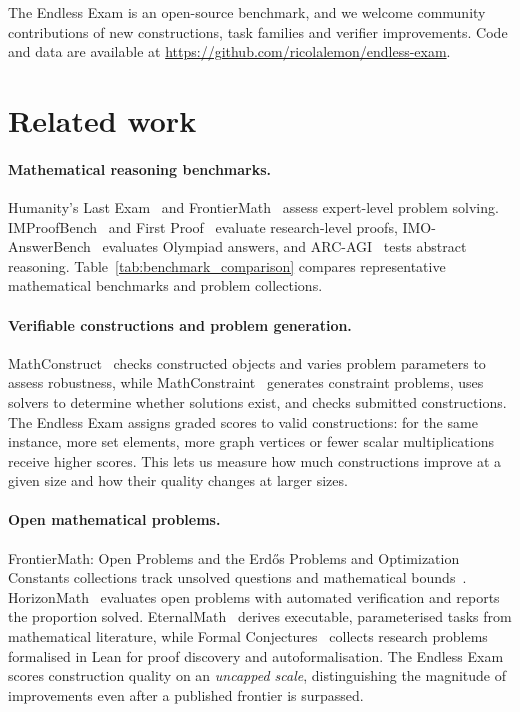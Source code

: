 \documentclass{article}
\begin{document}
The Endless Exam is an open-source benchmark, and we welcome community contributions of new constructions, task families and verifier improvements.
\ifdefined\EndlessExamPreprint
Code and data are available at \mbox{\url{https://github.com/ricolalemon/endless-exam}}.
\fi

\section{Related work}
\label{sec:related}

\paragraph{Mathematical reasoning benchmarks.}
Humanity's Last Exam~\citep{phan2025hle} and FrontierMath~\citep{glazer2024frontiermath,epoch2026frontiermath} assess expert-level problem solving. IMProofBench~\citep{schmitt2025improofbench} and First Proof~\citep{abouzaid2026firstproof} evaluate research-level proofs, IMO-AnswerBench~\citep{luong2025imobench} evaluates Olympiad answers, and ARC-AGI~\citep{chollet2019arc,chollet2025arcagi2} tests abstract reasoning. Table~\ref{tab:benchmark_comparison} compares representative mathematical benchmarks and problem collections.

\paragraph{Verifiable constructions and problem generation.}
MathConstruct~\citep{balunovic2025mathconstruct} checks constructed objects and varies problem parameters to assess robustness, while MathConstraint~\citep{pati2026mathconstraint} generates constraint problems, uses solvers to determine whether solutions exist, and checks submitted constructions. The Endless Exam assigns graded scores to valid constructions: for the same instance, more set elements, more graph vertices or fewer scalar multiplications receive higher scores. This lets us measure how much constructions improve at a given size and how their quality changes at larger sizes.

\paragraph{Open mathematical problems.}
FrontierMath: Open Problems and the Erd\H{o}s Problems and Optimization Constants collections track unsolved questions and mathematical bounds~\citep{epoch2026openproblems,bloom2021erdosproblems,davis2026constants}. HorizonMath~\citep{horizonmath2026} evaluates open problems with automated verification and reports the proportion solved. EternalMath~\citep{ma2026eternalmath} derives executable, parameterised tasks from mathematical literature, while Formal Conjectures~\citep{firsching2026formal} collects research problems formalised in Lean for proof discovery and autoformalisation. The Endless Exam scores construction quality on an \emph{uncapped scale}, distinguishing the magnitude of improvements even after a published frontier is surpassed.
\end{document}
